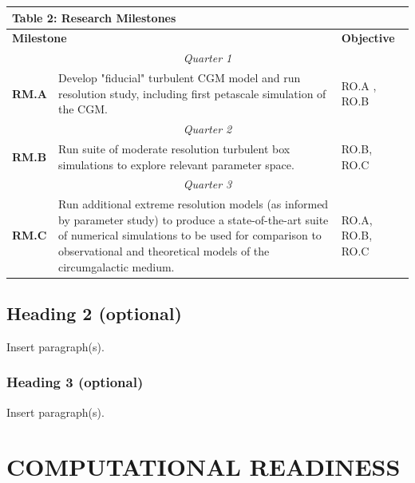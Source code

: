 \documentclass[11pt,letterpaper,english]{article}
\begin{document}
\begin{table}[h]
\vspace{-.12in}
\begin{tabular}{|l|p{4.6in}|l|} 
\multicolumn{3}{l}{\bf{Table 2: Research Milestones}}\\
\hline
\multicolumn{2}{|l|}{\bf Milestone} & {\bf Objective} \\ \hline
\multicolumn{3}{|c|}{\it Quarter 1} \\ \hline
\textbf{RM.A} & Develop "fiducial" turbulent CGM model and run resolution study, including first petascale simulation of the CGM. & RO.A , RO.B \\ \hline
\multicolumn{3}{|c|}{\it Quarter 2} \\ \hline
\textbf{RM.B} & Run suite of moderate resolution turbulent box simulations to explore relevant parameter space. & RO.B, RO.C\\ \hline
\multicolumn{3}{|c|}{\it Quarter 3} \\ \hline
\textbf{RM.C} & Run additional extreme resolution models (as informed by parameter study) to produce a state-of-the-art suite of numerical simulations to be used for comparison to observational and theoretical models of the circumgalactic medium. & RO.A, RO.B, RO.C \\ 
\hline
\end{tabular}
\end{table}

\vspace{-.25in}
\subsection{Heading 2 (optional)}
\vspace{-.2in}

Insert paragraph(s).

\vspace{-.25in}
\subsubsection{Heading 3 (optional)}
\vspace{-.2in}

Insert paragraph(s).

\vspace{-.25in}
\section{COMPUTATIONAL READINESS}
\vspace{-.2in}
\end{document}
